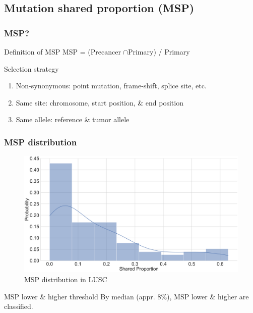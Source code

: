 \documentclass{beamer}
\begin{document}
        \subsection{Mutation shared proportion (MSP)}
            \begin{frame}
                \frametitle{MSP?}

                \begin{block}{Definition of MSP}
                    MSP = (Precancer $\cap$Primary) / Primary
                \end{block}

                \begin{block}{Selection strategy}
                    \begin{enumerate}
                        \item Non-synonymous: point mutation, frame-shift, splice site, etc.
                        \item Same site: chromosome, start position, \& end position
                        \item Same allele: reference \& tumor allele
                    \end{enumerate}
                \end{block}
            \end{frame}

            \begin{frame}
                \frametitle{MSP distribution}

                \begin{figure}
                    \includegraphics[width=0.6 \linewidth]{figures/Mutation_Shared_Proportion/Histogram/BWA.SQC.SharedProportion.pdf}
                    \caption{MSP distribution in LUSC}
                \end{figure}

                \begin{exampleblock}{MSP lower \& higher threshold}
                    By median (appr. 8\%), MSP lower \& higher are classified.
                \end{exampleblock}
            \end{frame}
\end{document}
